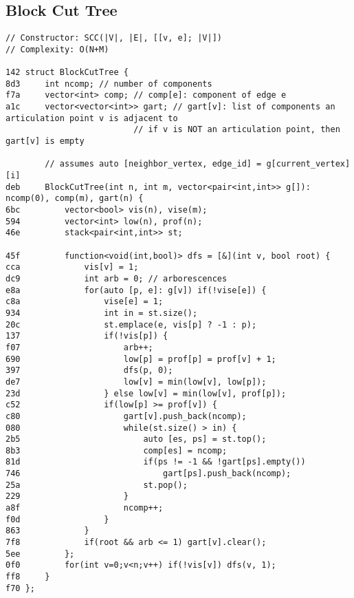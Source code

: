 \documentclass[11pt, a4paper, twoside]{article}
\begin{document}
\subsection{Block Cut Tree}
\begin{lstlisting}
// Constructor: SCC(|V|, |E|, [[v, e]; |V|])
// Complexity: O(N+M)

142 struct BlockCutTree {
8d3 	int ncomp; // number of components
f7a 	vector<int> comp; // comp[e]: component of edge e
a1c 	vector<vector<int>> gart; // gart[v]: list of components an articulation point v is adjacent to
    			          // if v is NOT an articulation point, then gart[v] is empty
    				
    	// assumes auto [neighbor_vertex, edge_id] = g[current_vertex][i]
deb 	BlockCutTree(int n, int m, vector<pair<int,int>> g[]): ncomp(0), comp(m), gart(n) {
6bc 		vector<bool> vis(n), vise(m);
594 		vector<int> low(n), prof(n);
46e 		stack<pair<int,int>> st;
    
45f 		function<void(int,bool)> dfs = [&](int v, bool root) {
cca 			vis[v] = 1;
dc9 			int arb = 0; // arborescences
e8a 			for(auto [p, e]: g[v]) if(!vise[e]) {
c8a 				vise[e] = 1;
934 				int in = st.size();
20c 				st.emplace(e, vis[p] ? -1 : p);
137 				if(!vis[p]) {
f07 					arb++;
690 					low[p] = prof[p] = prof[v] + 1;
397 					dfs(p, 0);
de7 					low[v] = min(low[v], low[p]);
23d 				} else low[v] = min(low[v], prof[p]);
c52 				if(low[p] >= prof[v]) {
c80 					gart[v].push_back(ncomp);
080 					while(st.size() > in) {
2b5 						auto [es, ps] = st.top();
8b3 						comp[es] = ncomp;
81d 						if(ps != -1 && !gart[ps].empty())
746 							gart[ps].push_back(ncomp);
25a 						st.pop();
229 					}
a8f 					ncomp++;
f0d 				}
863 			}
7f8 			if(root && arb <= 1) gart[v].clear();
5ee 		};
0f0 		for(int v=0;v<n;v++) if(!vis[v]) dfs(v, 1);
ff8 	}
f70 };
\end{lstlisting}
\end{document}
